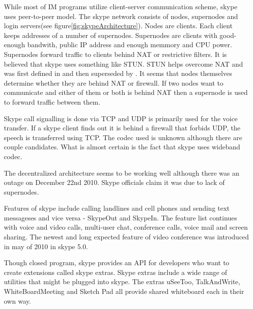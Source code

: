 While most of IM programs utilize client-server communication scheme, skype uses peer-to-peer model. The skype network consists of nodes, supernodes and login servers(see figure\ref{fig:skypeArchitecture}). Nodes are clients. Each client keeps addresses of a number of supernodes. Supernodes are clients with good-enough bandwith, public IP address and enough memmory and CPU power. Supernodes forward traffic to clients behind NAT or restrictive filters. It is believed that skype uses something like STUN. STUN helps overcome NAT and was first defined in \cite{STUNRFC} and then superseded by \cite{STUNRFCNEW}. It seems that nodes themselves determine whether they are behind NAT or firewall. If two nodes want to communicate and either of them or both is behind NAT then a supernode is used to forward traffic between them. 

Skype call signalling is done via TCP and UDP is primarily used for the voice transfer. If a skype client finds out it is behind a firewall that forbids UDP, the speech is transferred using TCP. The codec used is unknown although there are couple candidates. What is almost certain is the fact that skype uses wideband codec. 

The decentralized architecture seems to be working well although there was an outage on December 22nd 2010. Skype officials claim it was due to lack of supernodes\cite{skypeOutage}.  


Features of skype include calling landlines and cell phones and sending text messageses and vice versa - SkypeOut and SkypeIn. The feature list continues with voice and video calls, multi-user chat, conference calls, voice mail and screen sharing. The newest and long expected feature of video conference was introduced in may of 2010 in skype 5.0. 

Though closed program, skype provides an API for developers who want to create extensions called skype extras. Skype extras include a wide range of utilities that might be plugged into skype. The extras uSeeToo, TalkAndWrite, WhiteBoardMeeting and Sketch Pad all provide shared whiteboard each in their own way.    


